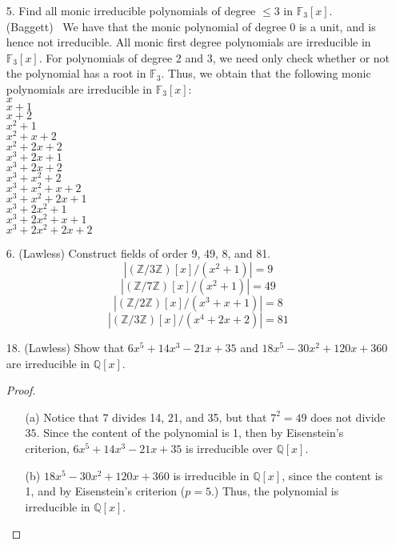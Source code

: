 \documentclass[10pt]{article}
\newcommand{\Z}{\mathbb{Z}}
\newcommand{\Q}{\mathbb{Q}}
\newcommand{\zmod}[1]{\Z/#1 \Z}
\begin{document}
\begin{itemize}
\item[5.] Find all monic irreducible polynomials of degree $\leq 3$ in $\mathbb{F}_3[x]$.
\\(Baggett) \ We have that the monic polynomial of degree 0 is a unit, and is hence not irreducible.
All monic first degree polynomials are irreducible in
$\mathbb{F}_3[x]$. For polynomials of degree 2 and 3, we need only
check whether or not the polynomial has a root in $\mathbb{F}_3$.
Thus, we obtain that the following monic polynomials are irreducible
in $\mathbb{F}_3[x]$:
\\ $x$
\\ $x + 1$
\\ $x + 2$
\\ $x^2 + 1$
\\ $x^2 + x + 2$
\\ $x^2 + 2x + 2$
\\ $x^3 + 2x + 1$
\\ $x^3 + 2x + 2$
\\ $x^3 + x^2 + 2$
\\ $x^3 + x^2 + x + 2$
\\ $x^3 + x^2 + 2x + 1$
\\ $x^3 + 2x^2 + 1$
\\ $x^3 + 2x^2 + x + 1$
\\ $x^3 + 2x^2 + 2x + 2$

\item[6.] (Lawless) Construct fields of order 9, 49, 8, and 81.
$$|(\zmod{3})[x]/(x^2+1)| = 9$$
$$|(\zmod{7})[x]/(x^2+1)| = 49$$
$$|(\zmod{2})[x]/(x^3+x+1)| = 8$$
$$|(\zmod{3})[x]/(x^4+2x+2)| = 81$$


\item[18.](Lawless) Show that $6x^5 + 14x^3 - 21x + 35$ and $18x^5 - 30x^2 + 120x + 360$ are irreducible in $\Q[x]$. 
\begin{proof}
\begin{itemize}

\item[(a)] Notice that $7$ divides 14, 21, and 35, but that $7^2 = 49$ does not divide $35$. Since the content of the polynomial is 1, then by Eisenstein's criterion, $6x^5 + 14x^3 - 21x + 35$ is irreducible over $\Q[x]$.

\item[(b)] $18x^5 - 30x^2 + 120x + 360$ is irreducible in $\Q[x]$, since the content is 1, and by Eisenstein's criterion ($p = 5$.) Thus, the polynomial is irreducible in $\Q[x]$.
\end{itemize}
\end{proof}


\end{itemize}
\end{document}
